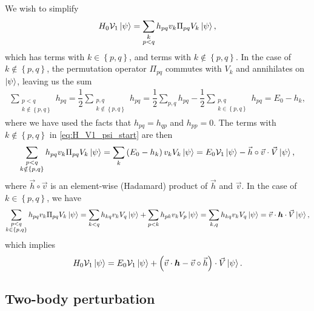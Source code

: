 \documentclass[nofootinbib,notitlepage,11pt]{revtex4-2}
\newcommand{\f}[2]{\dfrac{#1}{#2}} %
\newcommand{\p}[1]{\left(#1\right)} %
\renewcommand{\set}[1]{\left\{#1\right\}} %
\renewcommand{\c}{\cdot} %
\renewcommand{\oc}{\circ} %
\newcommand{\m}{\bm} %
\renewcommand{\v}{\vec} %
\newcommand{\1}{\mathds{1}}
\newcommand{\V}{\mathcal{V}}
\begin{document}
We wish to simplify
\begin{align}
  H_0 \V_1 \ket\psi
  = \sum_{\substack{k\\p<q}} h_{pq} v_k \Pi_{pq} V_k \ket\psi,
  \label{eq:H_V1_psi_start}
\end{align}
which has terms with $k\in\set{p,q}$, and terms with
$k\notin\set{p,q}$.  In the case of $k\notin\set{p,q}$, the
permutation operator $\Pi_{pq}$ commutes with $V_k$ and annihilates on
$\ket\psi$, leaving us the sum
\begin{align}
  \sum_{\substack{p<q\\k\notin\set{p,q}}} h_{pq}
  = \f12 \sum_{\substack{p,q\\k\notin\set{p,q}}} h_{pq}
  = \f12 \sum_{p,q} h_{pq}
  - \f12 \sum_{\substack{p,q\\k\in\set{p,q}}} h_{pq}
  = E_0 - h_k,
\end{align}
where we have used the facts that $h_{pq}=h_{qp}$ and $h_{pp}=0$.  The
terms with $k\notin\set{p,q}$ in \eqref{eq:H_V1_psi_start} are then
\begin{align}
  \sum_{\substack{p<q\\k\notin\set{p,q}}}
  h_{pq} v_k \Pi_{pq} V_k \ket\psi
  = \sum_k \p{E_0 - h_k} v_k V_k \ket\psi
  = E_0 \V_1 \ket\psi - \v h\oc\v v \c\v V \ket\psi,
\end{align}
where $\v h\oc\v v$ is an element-wise (Hadamard) product of $\v h$
and $\v v$.  In the case of $k\in\set{p,q}$, we have
\begin{align}
  \sum_{\substack{p<q\\k\in\set{p,q}}}
  h_{pq} v_k \Pi_{pq} V_k \ket\psi
  = \sum_{k<q} h_{kq} v_k V_q \ket\psi
  + \sum_{p<k} h_{pk} v_k V_p \ket\psi
  = \sum_{k,q} h_{kq} v_k V_q \ket\psi
  = \v v\c\m h\c\v V \ket\psi,
\end{align}
which implies
\begin{align}
  H_0 \V_1 \ket\psi
  = E_0 \V_1 \ket\psi
  + \p{\v v\c\m h - \v v\oc\v h}\c \v V \ket\psi.
\end{align}

\subsection{Two-body perturbation}
\label{sec:H_V2_psi}
\end{document}
